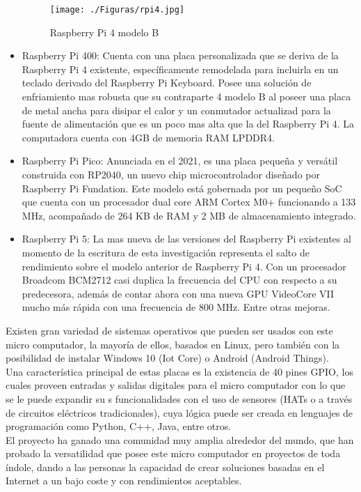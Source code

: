 \begin{itemize}
\begin{figure}[htb]
\centering
\texttt{[image: ./Figuras/rpi4.jpg]}
\caption{Raspberry Pi 4 modelo B}
\label{fig:rpi4}
\vspace*{-10pt}
\end{figure}

\item Raspberry Pi 400: Cuenta con una placa personalizada que se deriva de la Raspberry Pi 4 existente, específicamente remodelada para incluirla en un teclado derivado del Raspberry Pi Keyboard. Posee una solución de enfriamiento mas robusta que su contraparte 4 modelo B al poseer una placa de metal ancha para disipar el calor y un conmutador actualizad para la fuente de alimentación que es un poco mas alta que la del Raspberry Pi 4. La computadora cuenta con 4GB de memoria RAM LPDDR4.
\item Raspberry Pi Pico: Anunciada en el 2021, es una placa pequeña y versátil construida con RP2040, un nuevo chip microcontrolador diseñado por Raspberry Pi Fundation. Este modelo está gobernada por un pequeño SoC que cuenta con un procesador dual core ARM Cortex M0+ funcionando a 133 MHz, acompañado de 264 KB de RAM y 2 MB de almacenamiento integrado.
\item Raspberry Pi 5: La mas nueva de las versiones del Raspberry Pi existentes al momento de la escritura de esta investigación representa el salto de rendimiento sobre el modelo anterior de Raspberry Pi 4. Con un procesador  Broadcom BCM2712 casi duplica la frecuencia del CPU con respecto a su predecesora, además de contar ahora con una nueva GPU VideoCore VII mucho más rápida con una frecuencia de 800 MHz. Entre otras mejoras.
\end{itemize}
Existen gran variedad de sistemas operativos que pueden ser usados con este micro computador, la mayoría de ellos, basados en Linux, pero también con la posibilidad de instalar Windows 10 (Iot Core) o Android (Android Things).\\

Una característica principal de estas placas es la existencia de 40 pines GPIO, los cuales proveen entradas y salidas digitales para el micro computador con lo que se le puede expandir su s funcionalidades con el uso de sensores (HATs o a través de circuitos eléctricos tradicionales), cuya lógica puede ser creada en lenguajes de programación como Python, C++, Java, entre otros.\\

El proyecto ha ganado una comunidad muy amplia alrededor del mundo, que han probado la versatilidad que posee este micro computador en proyectos de toda índole, dando a las personas la capacidad de crear soluciones basadas en el Internet a un bajo coste y con rendimientos aceptables.

